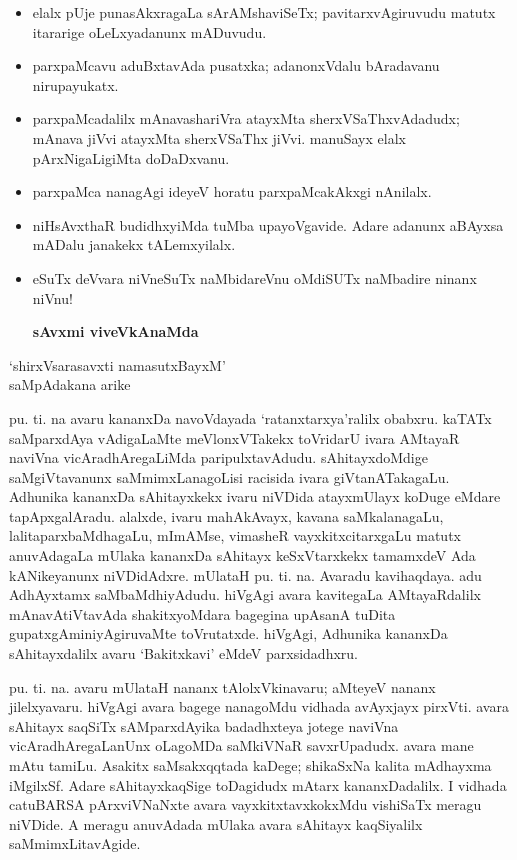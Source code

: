\bigskip

\begin{itemize}
\item elalx pUje punasAkxragaLa sArAMshaviSeTx; pavitarxvAgiruvudu matutx itararige oLeLxyadanunx mADuvudu.

\item parxpaMcavu aduBxtavAda pusatxka; adanonxVdalu bAradavanu nirupayukatx.

\item parxpaMcadalilx mAnavashariVra atayxMta sherxVSaThxvAdadudx; mAnava jiVvi atayxMta sherxVSaThx jiVvi. manuSayx elalx pArxNigaLigiMta doDaDxvanu.

\item parxpaMca nanagAgi ideyeV horatu parxpaMcakAkxgi nAnilalx.

\item niHsAvxthaR budidhxyiMda tuMba upayoVgavide. Adare adanunx aBAyxsa mADalu janakekx tALemxyilalx.

\item eSuTx deVvara niVneSuTx naMbidareVnu oMdiSUTx naMbadire ninanx niVnu!

\begin{flushright}
{\textbf {sAvxmi viveVkAnaMda}}
\end{flushright}
\end{itemize}

\newpage
\begin{center}
`shirxVsarasavxti namasutxBayxM'\\
saMpAdakana arike
\end{center}

pu. ti. na avaru kananxDa navoVdayada `ratanxtarxya'ralilx obabxru. kaTATx saMparxdAya vAdigaLaMte meVlonxVTakekx toVridarU ivara AMtayaR naviVna vicAradhAregaLiMda paripulxtavAdudu. sAhitayxdoMdige saMgiVtavanunx saMmimxLanagoLisi racisida ivara giVtanATakagaLu. Adhunika kananxDa sAhitayxkekx ivaru niVDida atayxmUlayx koDuge eMdare tapApxgalAradu. alalxde, ivaru mahAkAvayx, kavana saMkalanagaLu, lalitaparxbaMdhagaLu, mImAMse, vimasheR vayxkitxcitarxgaLu matutx anuvAdagaLa mUlaka kananxDa sAhitayx keSxVtarxkekx tamamxdeV Ada kANikeyanunx niVDidAdxre. mUlataH pu. ti. na. Avaradu kavihaqdaya. adu AdhAyxtamx saMbaMdhiyAdudu. hiVgAgi avara kavitegaLa AMtayaRdalilx mAnavAtiVtavAda shakitxyoMdara bagegina upAsanA tuDita gupatxgAminiyAgiruvaMte toVrutatxde. hiVgAgi, Adhunika kananxDa sAhitayxdalilx avaru `Bakitxkavi' eMdeV parxsidadhxru.

pu. ti. na. avaru mUlataH nananx tAlolxVkinavaru; aMteyeV nananx jilelxyavaru. hiVgAgi avara bagege nanagoMdu vidhada avAyxjayx pirxVti. avara sAhitayx saqSiTx sAMparxdAyika badadhxteya jotege naviVna vicAradhAregaLanUnx oLagoMDa saMkiVNaR savxrUpadudx. avara mane mAtu tamiLu. Asakitx saMsakxqqtada kaDege; shikaSxNa kalita mAdhayxma iMgilxSf. Adare sAhitayxkaqSige toDagidudx mAtarx kananxDadalilx. I vidhada catuBARSA pArxviVNaNxte avara vayxkitxtavxkokxMdu vishiSaTx meragu niVDide. A meragu anuvAdada mUlaka avara sAhitayx kaqSiyalilx saMmimxLitavAgide.

